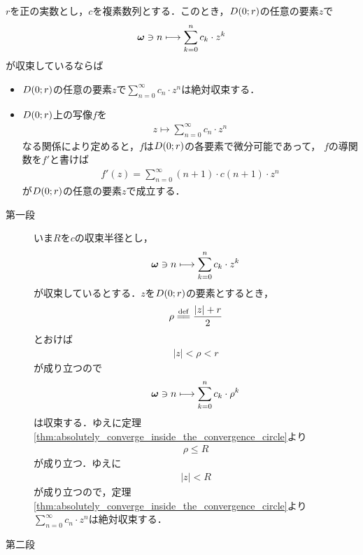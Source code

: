 	\begin{screen}
		\begin{thm}[級数で表される関数は微分可能]
			$r$を正の実数とし，$c$を複素数列とする．このとき，$D(0;r)$の任意の要素$z$で
			\begin{align}
				{\boldsymbol \omega} \ni n \longmapsto \sum_{k=0}^{n} c_{k} \cdot z^{k}
			\end{align}
			が収束しているならば
			\begin{itemize}
				\item $D(0;r)$の任意の要素$z$で$\sum_{n=0}^{\infty} c_{n} \cdot z^{n}$は絶対収束する．
				\item $D(0;r)$上の写像$f$を
					\begin{align}
						z \longmapsto \sum_{n=0}^{\infty} c_{n} \cdot z^{n}
					\end{align}
					なる関係により定めると，$f$は$D(0;r)$の各要素で微分可能であって，
					$f$の導関数を$f'$と書けば
					\begin{align}
						f'(z) = \sum_{n=0}^{\infty} (n+1) \cdot c(n+1) \cdot z^{n}
					\end{align}
					が$D(0;r)$の任意の要素$z$で成立する．
			\end{itemize}
		\end{thm}
	\end{screen}
	
	\begin{sketch}\mbox{}
		\begin{description}
			\item[第一段]
				いま$R$を$c$の収束半径とし，
				\begin{align}
					{\boldsymbol \omega} \ni n \longmapsto \sum_{k=0}^{n} c_{k} \cdot z^{k}
				\end{align}
				が収束しているとする．$z$を$D(0;r)$の要素とするとき，
				\begin{align}
					\rho \defeq \frac{|z| + r}{2}
				\end{align}
				とおけば
				\begin{align}
					|z| < \rho < r
				\end{align}
				が成り立つので
				\begin{align}
					{\boldsymbol \omega} \ni n \longmapsto \sum_{k=0}^{n} c_{k} \cdot \rho^{k}
				\end{align}
				は収束する．ゆえに定理\ref{thm:absolutely_converge_inside_the_convergence_circle}より
				\begin{align}
					\rho \leq R
				\end{align}
				が成り立つ．ゆえに
				\begin{align}
					|z| < R
				\end{align}
				が成り立つので，定理\ref{thm:absolutely_converge_inside_the_convergence_circle}より
				$\sum_{n=0}^{\infty} c_{n} \cdot z^{n}$は絶対収束する．
			
			\item[第二段]
				
		\end{description}
	\end{sketch}